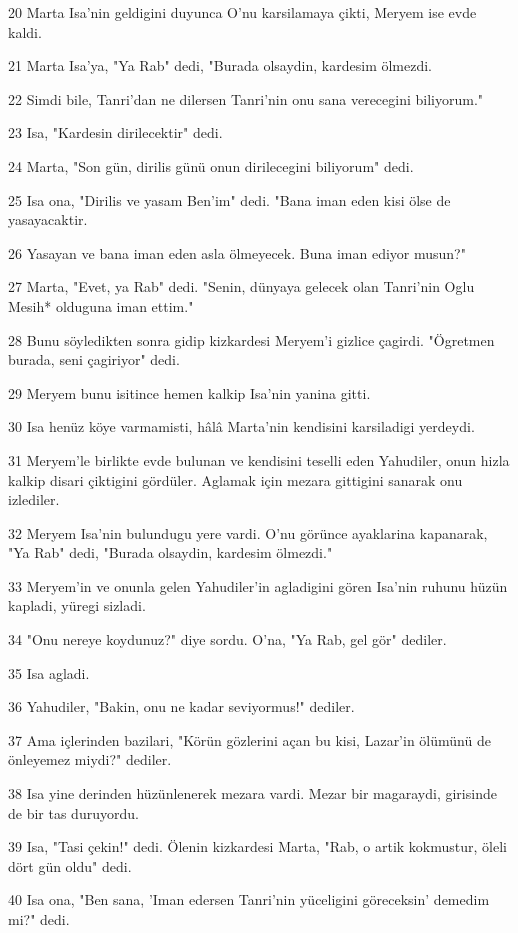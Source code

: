 \par 20 Marta Isa'nin geldigini duyunca O'nu karsilamaya çikti, Meryem ise evde kaldi.
\par 21 Marta Isa'ya, "Ya Rab" dedi, "Burada olsaydin, kardesim ölmezdi.
\par 22 Simdi bile, Tanri'dan ne dilersen Tanri'nin onu sana verecegini biliyorum."
\par 23 Isa, "Kardesin dirilecektir" dedi.
\par 24 Marta, "Son gün, dirilis günü onun dirilecegini biliyorum" dedi.
\par 25 Isa ona, "Dirilis ve yasam Ben'im" dedi. "Bana iman eden kisi ölse de yasayacaktir.
\par 26 Yasayan ve bana iman eden asla ölmeyecek. Buna iman ediyor musun?"
\par 27 Marta, "Evet, ya Rab" dedi. "Senin, dünyaya gelecek olan Tanri'nin Oglu Mesih* olduguna iman ettim."
\par 28 Bunu söyledikten sonra gidip kizkardesi Meryem'i gizlice çagirdi. "Ögretmen burada, seni çagiriyor" dedi.
\par 29 Meryem bunu isitince hemen kalkip Isa'nin yanina gitti.
\par 30 Isa henüz köye varmamisti, hâlâ Marta'nin kendisini karsiladigi yerdeydi.
\par 31 Meryem'le birlikte evde bulunan ve kendisini teselli eden Yahudiler, onun hizla kalkip disari çiktigini gördüler. Aglamak için mezara gittigini sanarak onu izlediler.
\par 32 Meryem Isa'nin bulundugu yere vardi. O'nu görünce ayaklarina kapanarak, "Ya Rab" dedi, "Burada olsaydin, kardesim ölmezdi."
\par 33 Meryem'in ve onunla gelen Yahudiler'in agladigini gören Isa'nin ruhunu hüzün kapladi, yüregi sizladi.
\par 34 "Onu nereye koydunuz?" diye sordu. O'na, "Ya Rab, gel gör" dediler.
\par 35 Isa agladi.
\par 36 Yahudiler, "Bakin, onu ne kadar seviyormus!" dediler.
\par 37 Ama içlerinden bazilari, "Körün gözlerini açan bu kisi, Lazar'in ölümünü de önleyemez miydi?" dediler.
\par 38 Isa yine derinden hüzünlenerek mezara vardi. Mezar bir magaraydi, girisinde de bir tas duruyordu.
\par 39 Isa, "Tasi çekin!" dedi. Ölenin kizkardesi Marta, "Rab, o artik kokmustur, öleli dört gün oldu" dedi.
\par 40 Isa ona, "Ben sana, 'Iman edersen Tanri'nin yüceligini göreceksin' demedim mi?" dedi.
